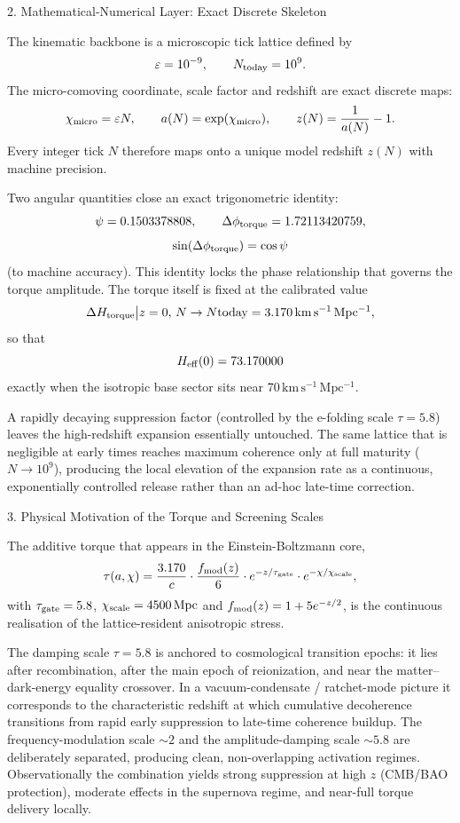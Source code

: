 2. Mathematical-Numerical Layer: Exact Discrete Skeleton

The kinematic backbone is a microscopic tick lattice defined by
\[
\varepsilon=10^{-9},\qquad N_{\rm today}=10^9.
\]
The micro-comoving coordinate, scale factor and redshift are exact discrete maps:
\[
\chi_{\rm micro}=\varepsilon N,\qquad
a(N)=\exp(\chi_{\rm micro}),\qquad
z(N)=\frac{1}{a(N)}-1.
\]
Every integer tick \(N\) therefore maps onto a unique model redshift \(z(N)\) with machine precision.

Two angular quantities close an exact trigonometric identity:
\[
\psi=0.1503378808,\qquad
\Delta\phi_{\rm torque}=1.72113420759,
\]
\[
\sin(\Delta\phi_{\rm torque})=\cos\psi
\]
(to machine accuracy). This identity locks the phase relationship that governs the torque amplitude. The torque itself is fixed at the calibrated value
\[
\Delta H_{\rm torque}\big|{z=0,\,N\to N{\rm today}}=3.170\,\mathrm{km\,s^{-1}\,Mpc^{-1}},
\]
so that
\[
H_{\rm eff}(0)=73.170000
\]
exactly when the isotropic base sector sits near \(70\,\mathrm{km\,s^{-1}\,Mpc^{-1}}\).  

A rapidly decaying suppression factor (controlled by the e-folding scale \(\tau=5.8\)) leaves the high-redshift expansion essentially untouched. The same lattice that is negligible at early times reaches maximum coherence only at full maturity (\(N\to10^9\)), producing the local elevation of the expansion rate as a continuous, exponentially controlled release rather than an ad-hoc late-time correction.

3. Physical Motivation of the Torque and Screening Scales

The additive torque that appears in the Einstein-Boltzmann core,
\[
\tau(a,\chi)=\frac{3.170}{c}\cdot\frac{f_{\rm mod}(z)}{6}\cdot e^{-z/\tau_{\rm gate}}\cdot e^{-\chi/\chi_{\rm scale}},
\]
with \(\tau_{\rm gate}=5.8\), \(\chi_{\rm scale}=4500\,\mathrm{Mpc}\) and \(f_{\rm mod}(z)=1+5e^{-z/2}\), is the continuous realisation of the lattice-resident anisotropic stress.  

The damping scale \(\tau=5.8\) is anchored to cosmological transition epochs: it lies after recombination, after the main epoch of reionization, and near the matter–dark-energy equality crossover. In a vacuum-condensate / ratchet-mode picture it corresponds to the characteristic redshift at which cumulative decoherence transitions from rapid early suppression to late-time coherence buildup. The frequency-modulation scale \(\sim2\) and the amplitude-damping scale \(\sim5.8\) are deliberately separated, producing clean, non-overlapping activation regimes. Observationally the combination yields strong suppression at high \(z\) (CMB/BAO protection), moderate effects in the supernova regime, and near-full torque delivery locally.

